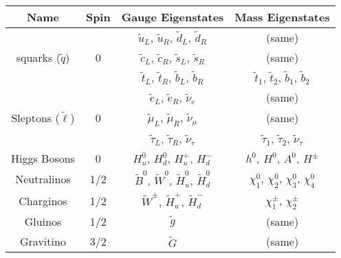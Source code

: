 \renewcommand{\arraystretch}{1.5}
%
\begin{tabular}{cccc}
\hline
\textbf{Name} & \textbf{Spin} & \textbf{Gauge Eigenstates} & \textbf{Mass Eigenstates}
 \\ \hline \hline
\multirow{3}{*}{squarks ($\tilde{q}$)} & \multirow{3}{*}{0} & $\tilde{u}_L$, $\tilde{u}_R$, $\tilde{d}_L$, $\tilde{d}_R$ & (same) \\
 &  & $\tilde{c}_L$, $\tilde{c}_R$, $\tilde{s}_L$, $\tilde{s}_R$ & (same) \\
 &  & $\tilde{t}_L$, $\tilde{t}_R$, $\tilde{b}_L$, $\tilde{b}_R$ & $\tilde{t}_1$, $\tilde{t}_2$, $\tilde{b}_1$, $\tilde{b}_2$ \\ \hline
\multirow{3}{*}{Sleptons ($\tilde{\ell}$)} & \multirow{3}{*}{0} & $\tilde{e}_L$, $\tilde{e}_R$, $\tilde{\nu}_{e}$ & (same) \\
 &  & $\tilde{\mu}_L$, $\tilde{\mu}_R$, $\tilde{\nu}_{\mu}$ & (same) \\
 &  & $\tilde{\tau}_L$, $\tilde{\tau}_R$, $\tilde{\nu}_{\tau}$ & $\tilde{\tau}_1$, $\tilde{\tau}_2$, $\tilde{\nu}_{\tau}$ \\ \hline
Higgs Bosons & 0 & $H_u^0$, $H_d^0$, $H^+_u$, $H^-_d$ & $h^0$,  $H^0$, $A^0$, $H^{\pm}$ \\ \hline
Neutralinos &1/2 & $\tilde{B}^0$, $\tilde{W}^0$, $\tilde{H}^0_u$, $\tilde{H}^0_d$ & $\chi^0_1$, $\chi^0_2$, $\chi^0_3$, $\chi^0_4$ \\
Charginos & 1/2 & $\tilde{W}^{\pm}$, $\tilde{H}^+_u$, $\tilde{H}^-_d$ & $\chi^{\pm}_1$, $\chi^{\pm}_2$ \\ \hline
Gluinos & 1/2 & $\tilde{g}$ & (same) \\ 
Gravitino & 3/2 & $\tilde{G}$ & (same) \\ \hline
\end{tabular}
\renewcommand{\arraystretch}{1}
%